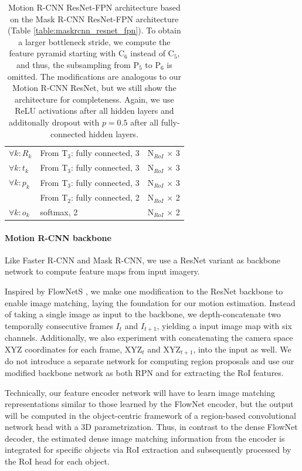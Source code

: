 {\begin{table}[h]
\begin{tabular}{llr}
$\forall k: R_k$ & From T$_3$: fully connected, 3 & N$_{RoI}$ $\times$ 3 \\
$\forall k: t_k$ & From T$_3$: fully connected, 3 & N$_{RoI}$ $\times$ 3 \\
$\forall k: p_k$ & From T$_3$: fully connected, 3 & N$_{RoI}$ $\times$ 3 \\
& From T$_2$: fully connected, 2 & N$_{RoI}$ $\times$ 2 \\
$\forall k: o_k$ & softmax, 2 & N$_{RoI}$ $\times$ 2 \\

\bottomrule
\end{tabular}

\caption {
Motion R-CNN ResNet-FPN architecture based on the Mask R-CNN
ResNet-FPN architecture (Table \ref{table:maskrcnn_resnet_fpn}).
To obtain a larger bottleneck stride, we compute the feature pyramid starting
with C$_6$ instead of C$_5$, and thus, the subsampling from P$_5$ to P$_6$ is omitted.
The modifications are analogous to our Motion R-CNN ResNet,
but we still show the architecture for completeness.
Again, we use ReLU activations after all hidden layers and
additonally dropout with $p = 0.5$ after all fully-connected hidden layers.
}
\label{table:motionrcnn_resnet_fpn}
\end{table}
}

\paragraph{Motion R-CNN backbone}
Like Faster R-CNN and Mask R-CNN, we use a ResNet variant \cite{ResNet} as backbone network to compute feature maps from input imagery.

Inspired by FlowNetS \cite{FlowNet}, we make one modification to the ResNet backbone to enable image matching,
laying the foundation for our motion estimation. Instead of taking a single image as input to the backbone,
we depth-concatenate two temporally consecutive frames $I_t$ and $I_{t+1}$, yielding a input image map with six channels.
Additionally, we also experiment with concatenating the camera space XYZ coordinates for each frame,
XYZ$_t$ and XYZ$_{t+1}$, into the input as well.
We do not introduce a separate network for computing region proposals and use our modified backbone network
as both RPN and for extracting the RoI features.

Technically, our feature encoder network will have to learn image matching representations similar to
those learned by the FlowNet encoder, but the output will be computed in the
object-centric framework of a region-based convolutional network head with a 3D parametrization.
Thus, in contrast to the dense FlowNet decoder, the estimated dense image matching information
from the encoder is integrated for specific objects via RoI extraction and subsequently
processed by the RoI head for each object.

